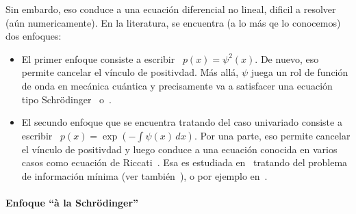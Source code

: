 Sin  embardo, eso  conduce a  una ecuaci\'on  diferencial no  lineal, dificil  a
resolver (a\'un numericamente).   En la literatura, se encuentra (a  lo m\'as qe
lo conocemos) dos enfoques:
%
\begin{itemize}
%
\item El  primer enfoque consiste a escribir \ $p(x) = \psi^2(x)$. De nuevo, eso
permite cancelar el  v\'inculo de positivdad. M\'as all\'a, $\psi$  juega un rol
de funci\'on de onda en mec\'anica cu\'antica y precisamente va a satisfacer una
ecuaci\'on tipo Schr\"odinger~\cite{Fri89,  Fri90, FriSof95, FriPla99, FriPla02,
Fri98, Fri04} o~\cite{BorLew96, BorLew95, BerVig09}.
%
\item El secundo enfoque que se encuentra tratando del caso univariado consiste a
escribir \ $\displaystyle  p(x) = \exp\left( - \int \psi(x)  \, dx \right)$. Por
una parte, eso permite cancelar el v\'inculo de positivdad y luego conduce a una
ecuaci\'on conocida  en varios  casos como  ecuaci\'on de  Riccati~\cite{Ric1724}.  Esa  es
estudiada en~\cite{Ziv98} tratando del problema de informaci\'on m\'inima  (ver tambi\'en~\cite{BorLew96, BorLew96, Ziv98, FriPla99}), o por ejemplo en~\cite{}.
\end{itemize}






\paragraph{Enfoque ``\`a la Schr\"odinger''}

